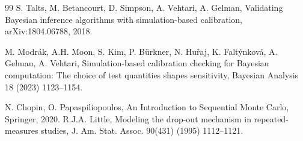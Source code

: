 \documentclass[a4paper,fleqn,longmktitle]{cas-sc}
\begin{document}
\begin{thebibliography}{99}
S. Talts, M. Betancourt, D. Simpson, A. Vehtari, A. Gelman, Validating Bayesian inference algorithms with simulation-based calibration, arXiv:1804.06788, 2018.

M. Modr\'{a}k, A.H. Moon, S. Kim, P. B\"{u}rkner, N. Hu\v{r}aj, K. Falt\'{y}nkov\'{a}, A. Gelman, A. Vehtari, Simulation-based calibration checking for Bayesian computation: The choice of test quantities shapes sensitivity, Bayesian Analysis 18 (2023) 1123--1154.

N. Chopin, O. Papaspiliopoulos, An Introduction to Sequential Monte Carlo, Springer, 2020.
R.J.A. Little, Modeling the drop-out mechanism in repeated-measures studies, J. Am. Stat. Assoc. 90(431) (1995) 1112--1121.




\end{thebibliography}
\end{document}

